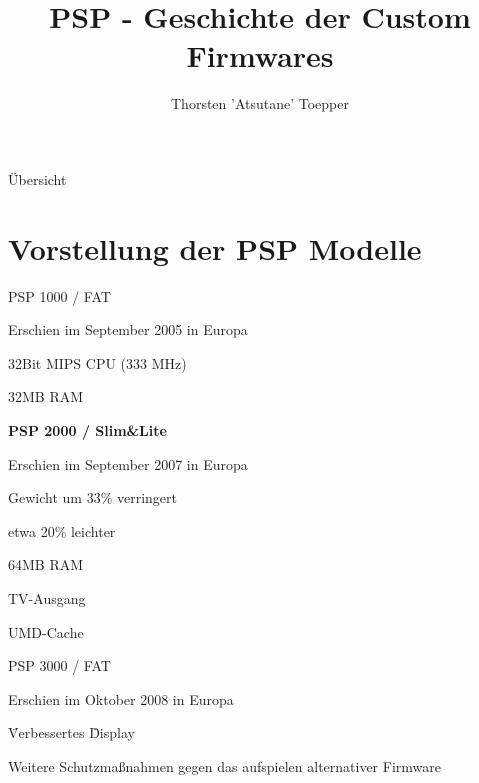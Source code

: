 \documentclass[mode=print,paper=screen,style=jefka]{powerdot}
\author{Thorsten 'Atsutane' Toepper}
\title{PSP - Geschichte der Custom Firmwares}
\begin{document}
\maketitle
\begin{slide}{Übersicht}
  \tableofcontents[content=sections]
\end{slide}


\section{Vorstellung der PSP Modelle}
\begin{slide}{PSP 1000 / FAT}
	\begin{list}{-}{}
		\item{Erschien im September 2005 in Europa}
		\item{32Bit MIPS CPU (333 MHz)}
		\item{32MB RAM}
	\end{list}

	\begin{LARGE}\textbf{PSP 2000 / Slim\&Lite}\end{LARGE}
	\begin{list}{-}{}
		\item{Erschien im September 2007 in Europa}
		\item{Gewicht um 33\% verringert}
		\item{etwa 20\% leichter}
		\item{64MB RAM}
		\item{TV-Ausgang}
		\item{UMD-Cache}
	\end{list}
\end{slide}

\begin{slide}{PSP 3000 / FAT}
	\begin{list}{-}{}
		\item{Erschien im Oktober 2008 in Europa}
		\item{\"  Verbessertes  \" Display}
		\item{Weitere Schutzmaßnahmen gegen das aufspielen alternativer Firmware}
	\end{list}
\end{slide}
\end{document}
